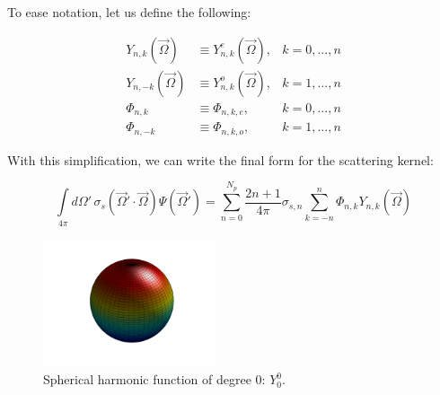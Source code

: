 \noindent To ease notation, let us define the following:

\begin{equation}
\label{eq::App_SN_sharm_flux_ease}
\begin{aligned}
Y_{n,k} (\vec{\Omega}) &\equiv Y_{n,k}^e (\vec{\Omega}), & k=0,...,n\\
Y_{n,-k} (\vec{\Omega}) &\equiv Y_{n,k}^o (\vec{\Omega}), & k=1,...,n\\
\Phi_{n,k} &\equiv \Phi_{n,k,e}, & k=0,...,n\\ 
\Phi_{n,-k} &\equiv\Phi_{n,k,o}, & k=1,...,n
\end{aligned} 
\end{equation}

\noindent With this simplification, we can write the final form for the scattering kernel:

\begin{equation}
\label{eq::App_SN_scatt_kernel_FINAL}
\int\limits_{4 \pi} d \Omega' \, \sigma_s (\vec{\Omega}' \cdot \vec{\Omega}) \Psi (\vec{\Omega}')  = \sum_{n=0}^{N_p} \frac{2n+1}{4 \pi}\sigma_{s,n} \sum_{k=-n}^{n} \Phi_{n,k} Y_{n,k} (\vec{\Omega})
\end{equation}


\iffalse
\pagebreak

\begin{figure}
\label{fig::Sn_Y0}
\centering
\includegraphics[width=0.45\textwidth]{figures/appendices/Y_0_0.png}
\caption{Spherical harmonic function of degree 0: $Y_{0}^{0}$.}
\end{figure}

